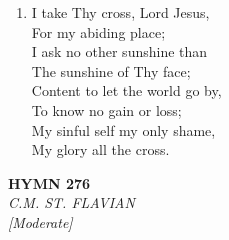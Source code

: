 \begin{enumerate}
    \item I take Thy cross, Lord Jesus, \\
        For my abiding place; \\
        I ask no other sunshine than \\
        The sunshine of Thy face; \\
        Content to let the world go by, \\
        To know no gain or loss; \\
        My sinful self my only shame, \\
        My glory all the cross.

\end{enumerate}

\newpage
\begin{center}
    {\Large \textbf{HYMN 276}}
    \\
    \textit{C.M. ST. FLAVIAN}
    \\
    \textit{\small [Moderate]}
\end{center}
\vspace{1em}

